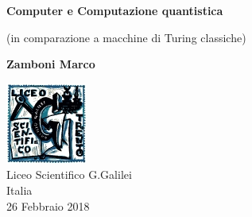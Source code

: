 \documentclass[10pt]{report}
\begin{document}
    \begin{center}
        \vspace*{1cm}
        
        \Huge
        \textbf{Computer e Computazione quantistica}
        
        \vspace{0.5cm}
		\LARGE        
        (in comparazione a macchine di Turing classiche)
        
        \vspace{1.5cm}
        \huge
        \textbf{Zamboni Marco}
        
        \vfill
        
		\includegraphics[scale=1]{logoG}\\		
		\vspace{1.0cm}		
		\Large        
        Liceo Scientifico G.Galilei\\
        Italia\\
        26 Febbraio 2018
        
    \end{center}
\end{document}
